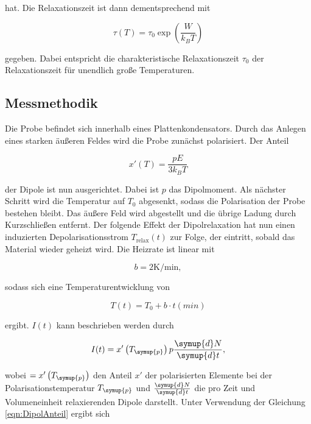 hat. Die Relaxationszeit ist dann dementsprechend mit 

\begin{equation}
    \label{eqn:rel}
    \tau\left(T\right) = \tau_0 \exp{\left(\frac{W}{k_B T}\right)}
\end{equation}

gegeben. Dabei entspricht die charakteristische Relaxationszeit $\tau_0$ der Relaxationszeit für unendlich große Temperaturen. 

\subsection{Messmethodik}

Die Probe befindet sich innerhalb eines Plattenkondensators. Durch das Anlegen eines starken äußeren Feldes wird die Probe zunächst 
polarisiert. Der Anteil 

\begin{equation}
    x'\left(T\right) = \frac{pE}{3k_BT}
    \label{eqn:DipolAnteil}
\end{equation}

der Dipole ist nun ausgerichtet. Dabei ist $p$ das Dipolmoment. Als nächster Schritt wird die Temperatur auf $T_0$ abgesenkt, sodass die Polarisation der 
Probe bestehen bleibt. Das äußere Feld wird abgestellt und die übrige Ladung durch Kurzschließen entfernt. Der folgende Effekt der Dipolrelaxation
hat nun einen induzierten Depolarisationsstrom $T_\text{relax}\left(t\right)$ zur Folge, der eintritt, sobald das Material wieder geheizt wird. 
Die Heizrate ist linear mit 

\begin{equation*}
    b = 2 \si{\kelvin\per\minute},
\end{equation*}

sodass sich eine Temperaturentwicklung von

\begin{equation*}
    T(t) = T_0 + b\cdot t(min)
\end{equation*}

ergibt. $I(t)$ kann beschrieben werden durch 

\begin{equation*}
    I(t) = x'\left(T_{\symup{p}}\right)p\frac{\symup{d}N}{\symup{d}t},
\end{equation*}

wobei $ = x'\left(T_{\symup{p}}\right)$ den Anteil $x'$ der polarisierten Elemente bei der Polarisationstemperatur $T_{\symup{p}}$ und $\frac{\symup{d}N}{\symup{d}t}$ 
die pro Zeit und Volumeneinheit relaxierenden Dipole darstellt. Unter Verwendung der Gleichung \eqref{eqn:DipolAnteil} ergibt sich

